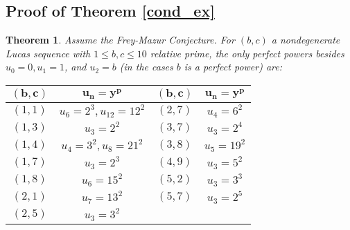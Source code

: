 \documentclass[12pt]{amsart}
\newtheorem{thm}{Theorem}[section]
\theoremstyle{definition}
\begin{document}
\subsection{Proof of Theorem \ref{cond_ex}}

\begin{thm}\label{cond_ex_inplace}
Assume the Frey-Mazur Conjecture.  For $(b,c)$ a nondegenerate Lucas sequence with $1 \leq b,c \leq 10$ relative prime, the only perfect powers besides $u_0=0,u_1=1$, and $u_2 = b$ (in the cases $b$ is a perfect power) are:
\begin{center}
\begin{tabular}{c | c || c | c}
$\mathbf{(b,c)}$ & $\mathbf{u_n=y^p}$ & $\mathbf{(b,c)}$ & $\mathbf{u_n = y^p}$ \\ \hline
$(1,1)$ & $u_6 = 2^3, u_{12} = 12^2$ & $(2,7)$ & $u_4 = 6^2$ \\
$(1,3)$ & $u_3 = 2^2$ & $(3,7)$ & $u_3 = 2^4$ \\
$(1,4)$ & $u_4 = 3^2, u_8 = 21^2$ & $(3,8)$ & $u_5 = 19^2$ \\
$(1,7)$ & $u_3 = 2^3$ & $(4,9)$ & $u_3 = 5^2$ \\
$(1,8)$ & $u_6 = 15^2$ & $(5,2)$ & $u_3 = 3^3$ \\
$(2,1)$ &  $u_7 = 13^2$ & $(5,7)$ & $u_3 = 2^5$ \\
$(2,5)$ & $u_3 = 3^2$ \\
\end{tabular}
\end{center}
\end{thm}







{}

\end{document}
